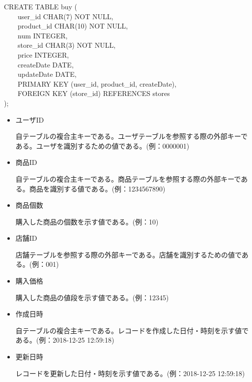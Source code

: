 \documentclass[a4j]{jarticle}
\begin{document}
\begin{screen}
CREATE TABLE buy (\\
　　user\_id CHAR(7) NOT NULL,\\
　　product\_id CHAR(10) NOT NULL,\\
　　num INTEGER,\\
　　store\_id CHAR(3) NOT NULL,\\
　　price INTEGER,\\
　　createDate DATE,\\
　　updateDate DATE,\\
　　PRIMARY KEY (user\_id, product\_id, createDate),\\
　　FOREIGN KEY (store\_id) REFERENCES stores\\
);
\end{screen}
\begin{itemize}
\item ユーザID

  自テーブルの複合主キーである。ユーザテーブルを参照する際の外部キーである。ユーザを識別するための値である。(例：0000001)

\item 商品ID

  自テーブルの複合主キーである。商品テーブルを参照する際の外部キーである。商品を識別する値である。(例：1234567890)

\item 商品個数

  購入した商品の個数を示す値である。(例：10)

\item 店舗ID

  店舗テーブルを参照する際の外部キーである。店舗を識別するための値である。(例：001)

\item 購入価格

  購入した商品の値段を示す値である。(例：12345)

\item 作成日時

  自テーブルの複合主キーである。レコードを作成した日付・時刻を示す値である。(例：2018-12-25 12:59:18)

\item 更新日時

  レコードを更新した日付・時刻を示す値である。(例：2018-12-25 12:59:18)

\end{itemize}
\end{document}

